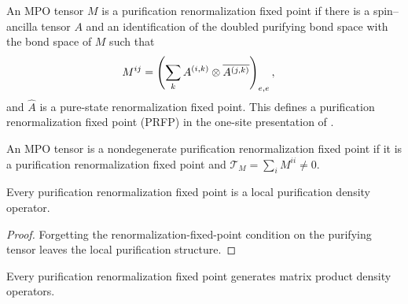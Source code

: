 \begin{definition}
    \label{def:mpdo_is_prfp}
    \leanok
    An MPO tensor $M$ is a purification renormalization fixed point if there is
    a spin--ancilla tensor $A$ and an identification of the doubled purifying
    bond space with the bond space of $M$ such that
    \begin{align}
        M^{ij}
         & =
        \left(\sum_k A^{(i,k)}\otimes
        \overline{A^{(j,k)}}\right)_{e,e},
        \notag
    \end{align}
    and $\widehat A$ is a pure-state renormalization fixed point. This defines a
    purification renormalization fixed point (PRFP) in the one-site
    presentation of \cite[lines~744--763]{Cirac2016MPDO_arXiv}.
\end{definition}

\begin{definition}
    \label{def:is_nondegenerate_prfp}
    \leanok
    An MPO tensor is a nondegenerate purification renormalization fixed point if
    it is a purification renormalization fixed point and
    $\mathcal T_M=\sum_i M^{ii}\ne0$.
\end{definition}

\begin{lemma}
    \label{thm:prfp_is_lpdo}
    \leanok
    Every purification renormalization fixed point is a local purification
    density operator.
\end{lemma}

\begin{proof}\leanok
    Forgetting the renormalization-fixed-point condition on the purifying
    tensor leaves the local purification structure.
\end{proof}

\begin{lemma}
    \label{thm:prfp_is_mpdo}
    \leanok
    Every purification renormalization fixed point generates matrix product
    density operators.
\end{lemma}

